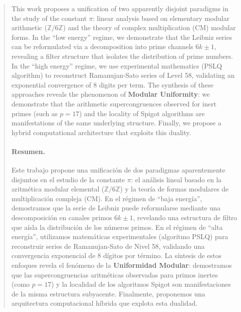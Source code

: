 \documentclass{article}
\theoremstyle{plain}
\theoremstyle{definition}
\theoremstyle{remark}
\numberwithin{equation}{section}
\begin{document}
\begin{abstract}
This work proposes a unification of two apparently disjoint paradigms in the study of the constant $\pi$: linear analysis based on elementary modular arithmetic ($\mathbb{Z}/6\mathbb{Z}$) and the theory of complex multiplication (CM) modular forms. In the ``low energy'' regime, we demonstrate that the Leibniz series can be reformulated via a decomposition into prime channels $6k \pm 1$, revealing a filter structure that isolates the distribution of prime numbers. In the ``high energy'' regime, we use experimental mathematics (PSLQ algorithm) to reconstruct Ramanujan-Sato series of Level 58, validating an exponential convergence of 8 digits per term. The synthesis of these approaches reveals the phenomenon of \textbf{Modular Uniformity}: we demonstrate that the arithmetic supercongruences observed for inert primes (such as $p=17$) and the locality of Spigot algorithms are manifestations of the same underlying structure. Finally, we propose a hybrid computational architecture that exploits this duality.

\paragraph{Resumen.} Este trabajo propone una unificación de dos paradigmas aparentemente disjuntos en el estudio de la constante $\pi$: el análisis lineal basado en la aritmética modular elemental ($\mathbb{Z}/6\mathbb{Z}$) y la teoría de formas modulares de multiplicación compleja (CM). En el régimen de ``baja energía'', demostramos que la serie de Leibniz puede reformularse mediante una descomposición en canales primos $6k \pm 1$, revelando una estructura de filtro que aísla la distribución de los números primos. En el régimen de ``alta energía'', utilizamos matemáticas experimentales (algoritmo PSLQ) para reconstruir series de Ramanujan-Sato de Nivel 58, validando una convergencia exponencial de 8 dígitos por término. La síntesis de estos enfoques revela el fenómeno de la \textbf{Uniformidad Modular}: demostramos que las supercongruencias aritméticas observadas para primos inertes (como $p=17$) y la localidad de los algoritmos Spigot son manifestaciones de la misma estructura subyacente. Finalmente, proponemos una arquitectura computacional híbrida que explota esta dualidad.
\end{abstract}

\maketitle
\end{document}
